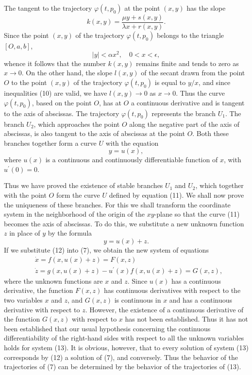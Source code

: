 \documentclass[10pt,a5paper]{book}
\makeatletter
\theoremstyle{plain}
\theoremstyle{definition}
\theoremstyle{remark}
\renewenvironment{proof}[1][\proofname]{\par
  \pushQED{\qed}%
  \normalfont\topsep6\p@\@plus6\p@\relax
  \trivlist
  \item\relax{\itshape #1\@addpunct{.}}\hspace\labelsep\ignorespaces
}{\popQED\endtrivlist\@endpefalse}
\makeatother
\begin{document}
\begin{proof}
The tangent to the trajectory $\varphi\left(t, p_{0}\right)$ at the point $(x, y)$ has the slope
\[
k(x, y)=\frac{\mu y+s(x, y)}{\lambda x+r(x, y)} .
\]
Since the point $(x, y)$ of the trajectory $\varphi\left(t, p_{0}\right)$ belongs to the triangle $[O, a, b]$,
\begin{equation*}
|y|<\alpha x^{2}, \quad 0<x<\epsilon, \tag{10}
\end{equation*}
whence it follows that the number $k(x, y)$ remains finite and tends to zero as $x \rightarrow 0$. On the other hand, the slope $l(x, y)$ of the secant drawn from the point $O$ to the point $(x, y)$ of the trajectory $\varphi\left(t, p_{0}\right)$ is equal to $y / x$, and since inequalities (10) are valid, we have $l(x, y) \rightarrow 0$ as $x \rightarrow 0$. Thus the curve $\varphi\left(t, p_{0}\right)$, based on the point $O$, has at $O$ a continuous derivative and is tangent to the axis of abscissas. The trajectory $\varphi\left(t, p_{0}\right)$ represents the branch $U_{1}$. The branch $U_{2}$, which approaches the point $O$ along the negative part of the axis of abscissas, is also tangent to the axis of abscissas at the point $O$. Both these branches together form a curve $U$ with the equation
\begin{equation*}
y=u(x), \tag{11}
\end{equation*}
where $u(x)$ is a continuous and continuously differentiable function of $x$, with $u^{\prime}(0)=0$.

Thus we have proved the existence of stable branches $U_{1}$ and $U_{2}$, which together with the point $O$ form the curve $U$ defined by equation (11). We shall now prove the uniqueness of these branches. For this we shall transform the coordinate system in the neighborhood of the origin of the $x y$-plane so that the curve (11) becomes the axis of abscissas. To do this, we substitute a new unknown function $z$ in place of $y$ by the formula
\begin{equation*}
y=u(x)+z . \tag{12}
\end{equation*}
If we substitute (12) into (7), we obtain the new system of equations
\begin{align*}
& \dot{x}=f(x, u(x)+z)=F(x, z) \\
& \dot{z}=g(x, u(x)+z)-u^{\prime}(x) f(x, u(x)+z)=G(x, z), \tag{13}
\end{align*}
where the unknown functions are $x$ and $z$. Since $u(x)$ has a continuous derivative, the function $F(x, z)$ has continuous derivatives with respect to the two variables $x$ and $z$, and $G(x, z)$ is continuous in $x$ and has a continuous derivative with respect to $z$. However, the existence of a continuous derivative of the function $G(x, z)$ with respect to $x$ has not been established. Thus it has not been established that our usual hypothesis concerning the continuous differentiability of the right-hand sides with respect to all the unknown variables holds for system (13). It is obvious, however, that to every solution of system (13) corresponds by (12) a solution of (7), and conversely. Thus the behavior of the trajectories of (7) can be determined by the behavior of the trajectories of (13).


\end{proof}
\end{document}
